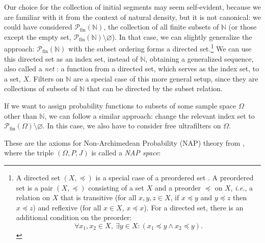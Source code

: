 Our choice for the collection of initial segments may seem self-evident, because we are familiar with it from the context of natural density, but it is not canonical: we could have considered $\mathcal{P}_{\textrm{fin}}(\mathbb{N})$, the collection of all finite subsets of $\mathbb{N}$ (or those except the empty set, $\mathcal{P}_{\textrm{fin}}(\mathbb{N}) \setminus \varnothing$). In that case, we can slightly generalize the approach: $\mathcal{P}_{\textrm{fin}}(\mathbb{N})$ with the subset ordering forms a directed set.\footnote{A directed set $(X, \preccurlyeq)$ is a special case of a preordered set \citep[see, \textit{e.g.},][p.~52]{Schechter:1997}. A preordered set is a pair $(X, \preccurlyeq)$ consisting of a set $X$ and a preorder $\preccurlyeq$ on $X$, \textit{i.e.}, a relation on $X$ that is transitive (for all $x,y,z \in X$, if $x \preccurlyeq y$ and $y \preccurlyeq z$ then $x \preccurlyeq z$) and reflexive (for all $x \in X$, $x \preccurlyeq x$). For a directed set, there is an additional condition on the preorder:
$$\forall x_1, x_2 \in X, \ \exists y \in X: (x_1 \preccurlyeq y \wedge x_2 \preccurlyeq y).$$} We can use this directed set as an index set, instead of $\mathbb{N}$, obtaining a generalized sequence, also called a \textit{net} \citep[see, \textit{e.g.},][pp.~157--158]{Schechter:1997}: a function from a directed set, which serves as the index set, to a set, $X$. Filters on $\mathbb{N}$ are a special case of this more general setup, since they are collections of subsets of $\mathbb{N}$ that can be directed by the subset relation.

If we want to assign probability functions to subsets of some sample space $\Omega$ other than $\mathbb{N}$, we can follow a similar approach: change the relevant index set to $\mathcal{P}_{\textrm{fin}}(\Omega) \setminus \varnothing$.
In this case, we also have to consider free ultrafilters on $\Omega$.

These are the axioms for Non-Archimedean Probability (NAP) theory from \citet{Benci_etal:2013}, where the triple $(\Omega ,P,J)$ is called a \textit{NAP space}:

